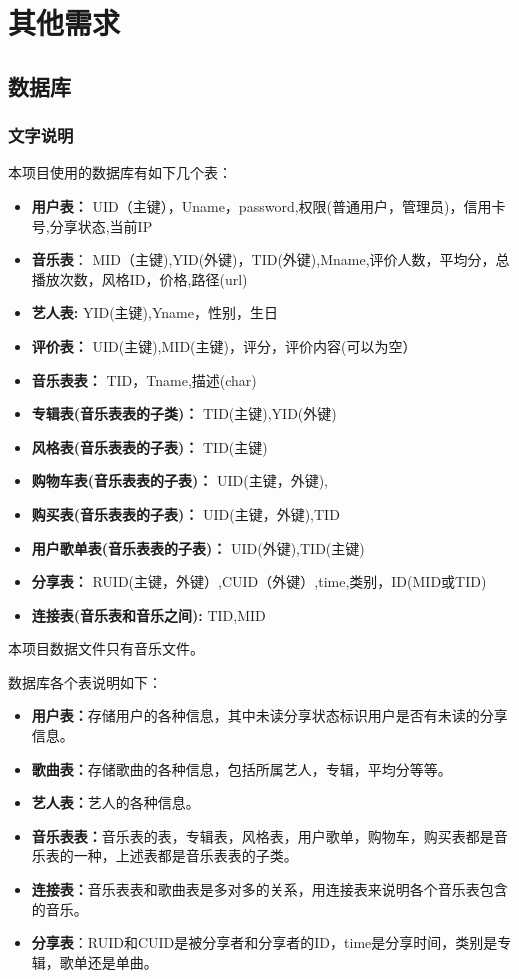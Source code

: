 \chapter{其他需求}

\section{数据库}
\subsection{文字说明}
本项目使用的数据库有如下几个表：
\begin{itemize}
	\item \textbf{用户表：}
	UID（主键），Uname，password,权限(普通用户，管理员)，信用卡号,分享状态,当前IP
	\item \textbf{音乐表}：
	MID（主键),YID(外键)，TID(外键),Mname,评价人数，平均分，总播放次数，风格ID，价格,路径(url)
	\item \textbf{艺人表:}
	YID(主键),Yname，性别，生日
	\item \textbf{评价表：}
	UID(主键),MID(主键)，评分，评价内容(可以为空）
	\item \textbf{音乐表表：}
	TID，Tname,描述(char)
	\item \textbf{专辑表(音乐表表的子类)：}
	TID(主键),YID(外键)
	\item \textbf{风格表(音乐表表的子表)：}
	TID(主键)
	\item \textbf{购物车表(音乐表表的子表)：}
	UID(主键，外键),
	\item \textbf{购买表(音乐表表的子表)：}
	UID(主键，外键),TID
	\item \textbf{用户歌单表(音乐表表的子表)：}
	UID(外键),TID(主键)
	\item \textbf{分享表：}
	RUID(主键，外键）,CUID（外键）,time,类别，ID(MID或TID)
	\item \textbf{连接表(音乐表和音乐之间):}
	TID,MID
\end{itemize}

本项目数据文件只有音乐文件。

数据库各个表说明如下：
\begin{itemize}
	\item \textbf{用户表：}存储用户的各种信息，其中未读分享状态标识用户是否有未读的分享信息。
	\item \textbf{歌曲表：}存储歌曲的各种信息，包括所属艺人，专辑，平均分等等。
	\item \textbf{艺人表：}艺人的各种信息。
	\item \textbf{音乐表表：}音乐表的表，专辑表，风格表，用户歌单，购物车，购买表都是音乐表的一种，上述表都是音乐表表的子类。
	\item \textbf{连接表：}音乐表表和歌曲表是多对多的关系，用连接表来说明各个音乐表包含的音乐。
	\item \textbf{分享表}：RUID和CUID是被分享者和分享者的ID，time是分享时间，类别是专辑，歌单还是单曲。

\end{itemize}

